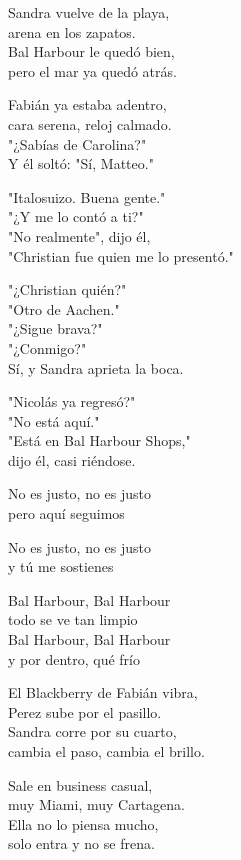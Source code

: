 \begin{lyrics}

Sandra vuelve de la playa,\\
arena en los zapatos.\\
Bal Harbour le quedó bien,\\
pero el mar ya quedó atrás.

Fabián ya estaba adentro,\\
cara serena, reloj calmado.\\
"¿Sabías de Carolina?"\\
Y él soltó: "Sí, Matteo."

"Italosuizo. Buena gente."\\
"¿Y me lo contó a ti?"\\
"No realmente", dijo él,\\
"Christian fue quien me lo presentó."

"¿Christian quién?"\\
"Otro de Aachen."\\
"¿Sigue brava?"\\
"¿Conmigo?"\\
Sí, y Sandra aprieta la boca.

"Nicolás ya regresó?"\\
"No está aquí."\\
"Está en Bal Harbour Shops,"\\
dijo él, casi riéndose.

No es justo, no es justo\\
pero aquí seguimos

No es justo, no es justo\\
y tú me sostienes

Bal Harbour, Bal Harbour\\
todo se ve tan limpio\\
Bal Harbour, Bal Harbour\\
y por dentro, qué frío

El Blackberry de Fabián vibra,\\
Perez sube por el pasillo.\\
Sandra corre por su cuarto,\\
cambia el paso, cambia el brillo.

Sale en business casual,\\
muy Miami, muy Cartagena.\\
Ella no lo piensa mucho,\\
solo entra y no se frena.


\end{lyrics}
